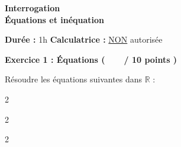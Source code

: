 \documentclass[12pt,a4paper]{exam}
\begin{document}
\begin{center}
    \Large\textbf{Interrogation\\Équations et inéquation}
\end{center}

\vspace{0.3cm}

\noindent
\textbf{Durée :} 1h \hfill
\textbf{Calculatrice :} \underline{NON} autorisée

\vspace{0.5cm}

\noindent
\textbf{Exercice 1 : Équations (\ \ \ \  / 10 points )}
\vspace{5pt}

\begin{questions}

\question[1] Résoudre les équations suivantes dans $\mathbb{R}$ :
\begin{multicols}{2}
\end{multicols}
\begin{multicols}{2}
\end{multicols}
\begin{multicols}{2}
\end{multicols}

\end{questions}
\end{document}
